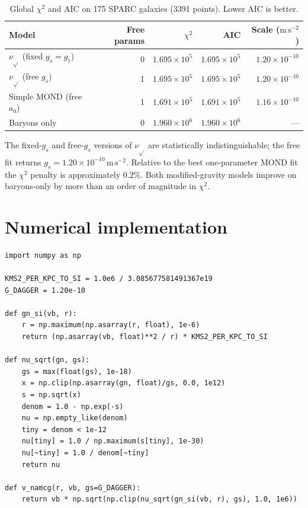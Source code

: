 \begin{table}[htbp]
\centering
\caption{Global \(\chi^2\) and AIC on 175 SPARC galaxies (3391 points).
Lower AIC is better.}
\label{tab:sparc_results}
\begin{tabular}{lrrrr}
\toprule
Model & Free params & \(\chi^2\) & AIC & Scale (\(\mathrm{m\,s^{-2}}\)) \\
\midrule
\(\nu_{\sqrt{}}\) (fixed \(g_s=g_\dagger\)) & 0 & \(1.695\times10^5\) & \(1.695\times10^5\) & \(1.20\times10^{-10}\) \\
\(\nu_{\sqrt{}}\) (free \(g_s\))            & 1 & \(1.695\times10^5\) & \(1.695\times10^5\) & \(1.20\times10^{-10}\) \\
Simple MOND (free \(a_0\))                 & 1 & \(1.691\times10^5\) & \(1.691\times10^5\) & \(1.16\times10^{-10}\) \\
Baryons only                               & 0 & \(1.960\times10^6\) & \(1.960\times10^6\) & --- \\
\bottomrule
\end{tabular}
\end{table}

The fixed-\(g_s\) and free-\(g_s\) versions of \(\nu_{\sqrt{}}\) are
statistically indistinguishable; the free fit returns
\(g_s=1.20\times10^{-10}\,\mathrm{m\,s^{-2}}\). Relative to the
best one-parameter MOND fit the \(\chi^2\) penalty is
approximately \(0.2\%\). Both modified-gravity models improve on
baryons-only by more than an order of magnitude in \(\chi^2\).

\section{Numerical implementation}
\label{sec:sparc-code}

\begin{lstlisting}[style=namcgPythonStyle,caption={Core evaluation functions.}]
import numpy as np

KMS2_PER_KPC_TO_SI = 1.0e6 / 3.085677581491367e19
G_DAGGER = 1.20e-10

def gn_si(vb, r):
    r = np.maximum(np.asarray(r, float), 1e-6)
    return (np.asarray(vb, float)**2 / r) * KMS2_PER_KPC_TO_SI

def nu_sqrt(gn, gs):
    gs = max(float(gs), 1e-18)
    x = np.clip(np.asarray(gn, float)/gs, 0.0, 1e12)
    s = np.sqrt(x)
    denom = 1.0 - np.exp(-s)
    nu = np.empty_like(denom)
    tiny = denom < 1e-12
    nu[tiny] = 1.0 / np.maximum(s[tiny], 1e-30)
    nu[~tiny] = 1.0 / denom[~tiny]
    return nu

def v_namcg(r, vb, gs=G_DAGGER):
    return vb * np.sqrt(np.clip(nu_sqrt(gn_si(vb, r), gs), 1.0, 1e6))
\end{lstlisting}

